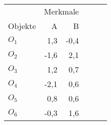 \begin{tabular}{lrrrrr}
    \toprule
    & \multicolumn{2}{c}{Merkmale} \\
    \cmidrule(lr){2-3}
    Objekte & A & B \\ 
    \midrule
    \(O_1\)  & 1,3 & -0,4  \\
    \(O_2\) & -1,6 & 2,1 \\
    \(O_3\) & 1,2 & 0,7 \\
    \(O_4\) & -2,1 & 0,6 \\
    \(O_5\) & 0,8 & 0,6 \\
    \(O_6\) & -0,3 & 1,6 \\
    \bottomrule
\end{tabular}